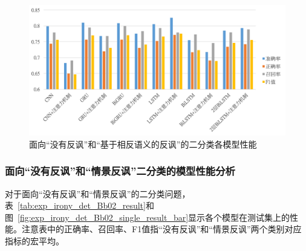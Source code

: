 \begin{figure}[H]
  \centering
  \includegraphics[width=\textwidth]{img/exp_irony_det_Bb01_single_result_bar.png}
  \caption{面向“没有反讽”和“基于相反语义的反讽”的二分类各模型性能}
  \label{fig:exp_irony_det_Bb01_single_result_bar}
\end{figure}

\subsubsection{面向“没有反讽”和“情景反讽”二分类的模型性能分析}
\label{sssec:exp_irony_det_Bb02_base}

对于面向“没有反讽”和“情景反讽”的二分类问题，表~\ref{tab:exp_irony_det_Bb02_result}和图~\ref{fig:exp_irony_det_Bb02_single_result_bar}显示各个模型在测试集上的性能。注意表中的正确率、召回率、F1值指“没有反讽”和“情景反讽”两个类别对应指标的宏平均。

